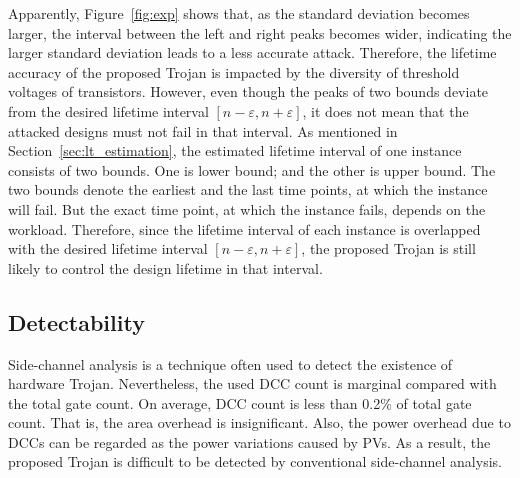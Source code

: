 Apparently, Figure~\ref{fig:exp} shows that, as the standard deviation becomes larger, the interval between the left and right peaks becomes wider, indicating the larger standard deviation leads to a less accurate attack. Therefore, the lifetime accuracy of the proposed Trojan is impacted by the diversity of threshold voltages of transistors. However, even though the peaks of two bounds deviate from the desired lifetime interval $[n - \varepsilon, n + \varepsilon]$, it does not mean that the attacked designs must not fail in that interval. As mentioned in Section~\ref{sec:lt_estimation}, the estimated lifetime interval of one instance consists of two bounds. One is lower bound; and the other is upper bound. The two bounds denote the earliest and the last time points, at which the instance will fail. But the exact time point, at which the instance fails, depends on the workload. Therefore, since the lifetime interval of each instance is overlapped with the desired lifetime interval $[n - \varepsilon, n + \varepsilon]$, the proposed Trojan is still likely to control the design lifetime in that interval.

\subsection{Detectability}
\label{sec:exp:det}
Side-channel analysis is a technique often used to detect the existence of hardware Trojan. Nevertheless, the used DCC count is marginal compared with the total gate count. On average, DCC count is less than 0.2\% of total gate count. That is, the area overhead is insignificant. Also, the power overhead due to DCCs can be regarded as the power variations caused by PVs. As a result, the proposed Trojan is difficult to be detected by conventional side-channel analysis. 

